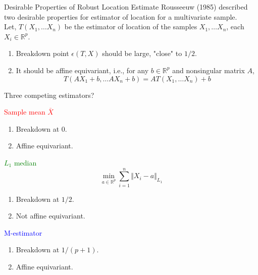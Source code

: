 \documentclass[10pt,xcolor=svgnames]{beamer} %
\newcommand{\R}{\mathbb{R}}
\begin{document}
\begin{frame}{Desirable Properties of Robust Location Estimate}
    Rousseeuw (1985) described two desirable properties for estimator of location for a multivariate sample.\\
    Let, $T(X_1, \dots X_n)$ be the estimator of location of the samples $X_1, \dots X_n$, each $X_i \in \R^p$.
    \begin{enumerate}
        \item Breakdown point $\epsilon(T, X)$ should be large, "close" to $1/2$.
        \pause
        \item It should be affine equivariant, i.e., for any $b \in \R^p$ and nonsingular matrix $A$,
        \begin{equation*}
            T(AX_1+b, \dots AX_n+b) = AT(X_1, \dots X_n) + b
        \end{equation*}
    \end{enumerate}
\end{frame}

\begin{frame}{Three competing estimators?}
    \begin{minipage}{0.32\textwidth}
        \textcolor{red}{Sample mean $\bar{X}$}\\
        \begin{enumerate}
            \item Breakdown at $0$.
            \item Affine equivariant.
        \end{enumerate}
    \end{minipage}
    \hfill
    \pause
    \begin{minipage}{0.32\textwidth}
        \textcolor{green}{$L_1$ median}\\
        \begin{equation*}
            \min_{a \in \R^p} \sum_{i=1}^n \Vert X_i - a\Vert_{L_1}
        \end{equation*}
        \begin{enumerate}
            \item Breakdown at $1/2$.
            \item Not affine equivariant.
        \end{enumerate}
    \end{minipage}
    \pause
    \hfill
    \begin{minipage}{0.32\textwidth}
        \textcolor{blue}{M-estimator}\\
        \begin{enumerate}
            \item Breakdown at $1/(p+1)$.
            \item Affine equivariant.
        \end{enumerate}
    \end{minipage}
\end{frame}
\end{document}
